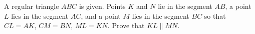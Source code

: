 A regular triangle $ABC$ is given. Points $K$ and $N$ lie in the segment $AB$, a point $L$ lies in the segment $AC$, and a point $M$  lies in the segment $BC$ so that $CL=AK$, $CM=BN$, $ML=KN$. Prove that $KL \parallel MN$.